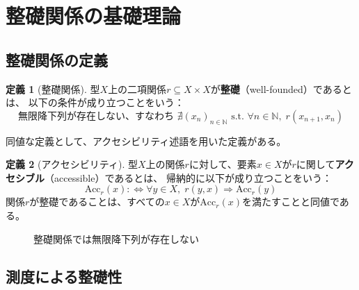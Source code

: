 \documentclass[11pt,a4paper]{ltjsarticle}
\theoremstyle{definition}
\newtheorem{definition}{定義}[section]
\begin{document}
\section{整礎関係の基礎理論}
\label{sec:preliminaries}

\subsection{整礎関係の定義}

\begin{definition}[整礎関係]
\label{def:well-founded}
型$X$上の二項関係$r \subseteq X \times X$が\textbf{整礎}（well-founded）であるとは、
以下の条件が成り立つことをいう：
\[
\text{無限降下列が存在しない、すなわち } \nexists (x_n)_{n \in \mathbb{N}} \text{ s.t. }
\forall n \in \mathbb{N},\; r(x_{n+1}, x_n)
\]
\end{definition}

同値な定義として、アクセシビリティ述語を用いた定義がある。

\begin{definition}[アクセシビリティ]
\label{def:accessible}
型$X$上の関係$r$に対して、要素$x \in X$が$r$に関して\textbf{アクセシブル}（accessible）であるとは、
帰納的に以下が成り立つことをいう：
\[
\mathrm{Acc}_r(x) :\!\!\iff \forall y \in X,\; r(y,x) \Rightarrow \mathrm{Acc}_r(y)
\]
関係$r$が整礎であることは、すべての$x \in X$が$\mathrm{Acc}_r(x)$を満たすことと同値である。
\end{definition}

\begin{figure}[htbp]
\centering
{}
\caption{整礎関係では無限降下列が存在しない}
\label{fig:no-infinite-descent}
\end{figure}

\subsection{測度による整礎性}
\end{document}
